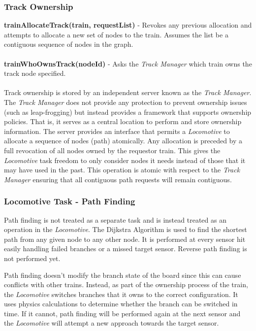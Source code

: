 \documentclass[twoside,a4paper]{refart}
\begin{document}
\subsubsection{Track Ownership}

\textbf{trainAllocateTrack(train, requestList)} - Revokes any previous allocation and attempts to allocate a new set of nodes to the train. Assumes the list be a contiguous sequence of nodes in the graph. \\\\
\textbf{trainWhoOwnsTrack(nodeId)} - Asks the \textit{Track Manager} which train owns the track node specified. \\\\

Track ownership is stored by an independent server known as the \textit{Track Manager}. The \textit{Track Manager} does not provide any protection to prevent ownership issues (such as leap-frogging) but instead provides a framework that supports ownership policies. That is, it serves as a central location to perform and store ownership information. The server provides an interface that permits a \textit{Locomotive} to allocate a sequence of nodes (path) atomically. Any allocation is preceded by a full revocation of all nodes owned by the requestor train. This gives the \textit{Locomotive} task freedom to only consider nodes it needs instead of those that it may have used in the past. This operation is atomic with respect to the \textit{Track Manager} ensuring that all contiguous path requests will remain contiguous.

\subsubsection{Locomotive Task - Path Finding}
Path finding is not treated as a separate task and is instead treated as an operation in the \textit{Locomotive}. The Dijkstra Algorithm is used to find the shortest path from any given node to any other node. It is performed at every sensor hit easily handling failed branches or a missed target sensor. Reverse path finding is not performed yet.

Path finding doesn't modify the branch state of the board since this can cause conflicts with other trains. Instead, as part of the ownership process of the train, the \textit{Locomotive} switches branches that it owns to the correct configuration. It uses physics calculations to determine whether the branch can be switched in time. If it cannot, path finding will be performed again at the next sensor and the \textit{Locomotive} will attempt a new approach towards the target sensor.
\end{document}
